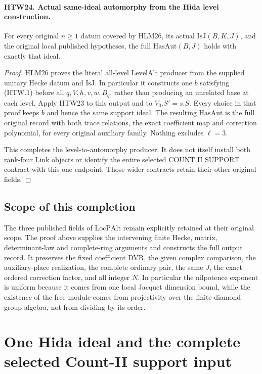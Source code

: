 \documentclass[11pt,a4paper]{article}
\numberwithin{equation}{section}
\theoremstyle{remark}\newtheorem{remark}[theorem]{Remark}
\begin{document}
\paragraph{HTW24. Actual same-ideal automorphy from the Hida level construction.}
\label{claim:HTW24}
For every original \(n\ge1\) datum covered by HLM26,
its actual \(\mathrm{IsJ}(B,K,J)\), and the original
local published hypotheses, the full
\(\mathrm{HasAut}(B,J)\) holds with exactly that ideal.
\begin{proof}
HLM26 proves the literal all-level
\(\mathrm{LevelAlt}\) producer from the supplied
unitary Hecke datum and \(\mathrm{IsJ}\).  In
particular it constructs one \(b\) satisfying
(HTW.1) before all \(q,V,h,v,w,B_q\), rather
than producing an unrelated base at each level.
Apply HTW23 to this output and to
\(V_0.S'=s.S\).  Every choice in that proof
keeps \(b\) and hence the same support ideal.
The resulting \(\mathrm{HasAut}\) is the full
original record with both trace relations,
the exact coefficient map and correction
polynomial, for every original auxiliary
family.  Nothing excludes \(\ell=3\).

This completes the level-to-automorphy producer.
It does not itself install both rank-four
\(\mathrm{Link}\) objects or identify the
entire selected \(\mathrm{COUNT\_\allowbreak II\_\allowbreak SUPPORT}\)
contract with this one endpoint.  Those wider
contracts retain their other original fields.
\end{proof}

\subsection{Scope of this completion}

The three published fields of \(\mathrm{LocPAlt}\)
remain explicitly retained at their original scope.
The proof above supplies the intervening finite
Hecke, matrix, determinant-law and complete-ring
arguments and constructs the full output record.
It preserves the fixed coefficient DVR, the
given complex comparison, the auxiliary-place
realization, the complete ordinary pair, the
same \(J\), the exact ordered correction factor,
and all integer \(N\).  In particular the
nilpotence exponent is uniform because it
comes from one local Jacquet dimension bound,
while the existence of the free module comes
from projectivity over the finite diamond
group algebra, not from dividing by its order.


\section{One Hida ideal and the complete selected Count-II support input}
\label{sec:hida-installation-v45}
\end{document}
